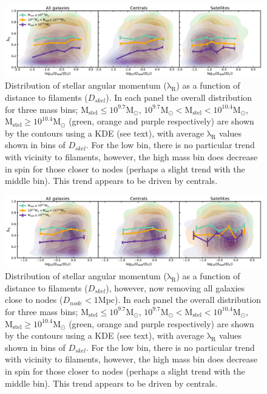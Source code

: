 \begin{figure}
    \centering\includegraphics[width=\linewidth]{thesis/latex/cw_spin/lambdaR_dskel_mass_split_3sigma.pdf}
    \caption{Distribution of stellar angular momentum ($\mathrm{\lambda_R}$) as a function of distance to filaments ($D_{skel}$). In each panel the overall distribution for three mass bins; $\mathrm{M_{stel} \leq 10^{9.7} M_{\odot}}$, $\mathrm{10^{9.7}M_{\odot} < M_{stel} < 10^{10.4}M_{\odot}}$, $\mathrm{M_{stel} \geq 10^{10.4}M_{\odot}}$ (green, orange and purple respectively) are shown by the contours using a KDE (see text), with average $\mathrm{\lambda_R}$ values shown in bins of $D_{skel}$. For the low bin, there is no particular trend with vicinity to filaments, however, the high mass bin does decrease in spin for those closer to nodes (perhaps a slight trend with the middle bin). This trend appears to be driven by centrals.}
\label{fig:lambdaR_dskel}
\end{figure} 

\begin{figure}
    \centering\includegraphics[width=\linewidth]{thesis/latex/cw_spin/lambdaR_dskel_no_node_mass_split_3sigma.pdf}
    \caption{Distribution of stellar angular momentum ($\mathrm{\lambda_R}$) as a function of distance to filaments ($D_{skel}$), however, now removing all galaxies close to nodes ($D_{node} < 1$Mpc). In each panel the overall distribution for three mass bins; $\mathrm{M_{stel} \leq 10^{9.7} M_{\odot}}$, $\mathrm{10^{9.7}M_{\odot} < M_{stel} < 10^{10.4}M_{\odot}}$, $\mathrm{M_{stel} \geq 10^{10.4}M_{\odot}}$ (green, orange and purple respectively) are shown by the contours using a KDE (see text), with average $\mathrm{\lambda_R}$ values shown in bins of $D_{skel}$. For the low bin, there is no particular trend with vicinity to filaments, however, the high mass bin does decrease in spin for those closer to nodes (perhaps a slight trend with the middle bin). This trend appears to be driven by centrals.}
\label{fig:lambdaR_dskel_nonode}
\end{figure} 

